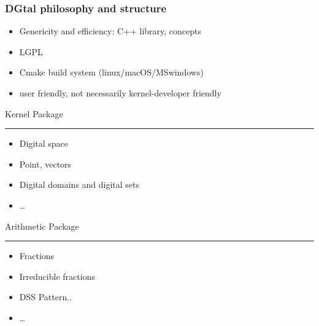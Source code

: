 \documentclass[8pt]{beamer}
\newcommand{\HH}{ \vspace{0.5pt}\hrule}
\begin{document}
\begin{frame}%
  \frametitle{DGtal philosophy and structure}

  \begin{block}{}
    \small
    \begin{itemize}
    \item  Genericity and efficiency: C++ library, concepts
    \item  LGPL
    \item Cmake build system (linux/macOS/MSwindows)
    \item user friendly, not necessarily kernel-developer friendly
    \end{itemize}
  \end{block} 
  \begin{alertblock}{\centering Kernel Package\HH}
            \small
          \begin{itemize}
          \item Digital space
          \item  Point, vectors
            \item Digital domains and digital sets
             \item  \ldots  
          \end{itemize}
       
   \end{alertblock}

 \begin{alertblock}{\centering Arithmetic Package\HH}
    \footnotesize
    \begin{itemize}
  \item  Fractions
  \item Irreducible fractions 
\item DSS Pattern..
    \item \ldots
    \end{itemize}
  \end{alertblock}

  
\end{frame}
\end{document}
